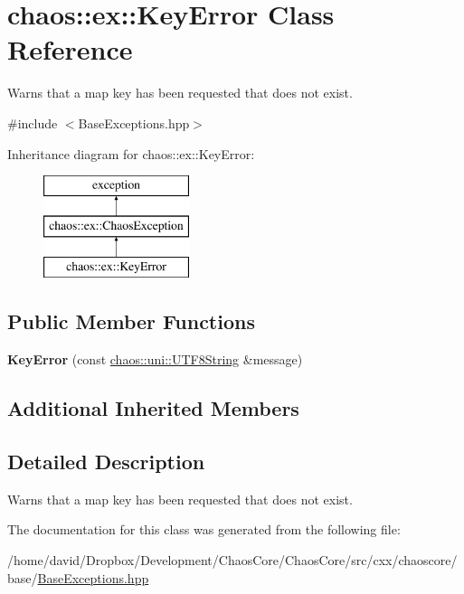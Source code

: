 \hypertarget{classchaos_1_1ex_1_1_key_error}{\section{chaos\-:\-:ex\-:\-:Key\-Error Class Reference}
\label{classchaos_1_1ex_1_1_key_error}
}


Warns that a map key has been requested that does not exist.  




{\ttfamily \#include $<$Base\-Exceptions.\-hpp$>$}

Inheritance diagram for chaos\-:\-:ex\-:\-:Key\-Error\-:\begin{figure}[H]
\begin{center}
\leavevmode
\includegraphics[height=3.000000cm]{classchaos_1_1ex_1_1_key_error}
\end{center}
\end{figure}
\subsection*{Public Member Functions}
\begin{DoxyCompactItemize}
\item 
\hypertarget{classchaos_1_1ex_1_1_key_error_ab784663047d04831ecb9150672a09b18}{{\bfseries Key\-Error} (const \hyperlink{classchaos_1_1uni_1_1_u_t_f8_string}{chaos\-::uni\-::\-U\-T\-F8\-String} \&message)}\label{classchaos_1_1ex_1_1_key_error_ab784663047d04831ecb9150672a09b18}

\end{DoxyCompactItemize}
\subsection*{Additional Inherited Members}


\subsection{Detailed Description}
Warns that a map key has been requested that does not exist. 

The documentation for this class was generated from the following file\-:\begin{DoxyCompactItemize}
\item 
/home/david/\-Dropbox/\-Development/\-Chaos\-Core/\-Chaos\-Core/src/cxx/chaoscore/base/\hyperlink{_base_exceptions_8hpp}{Base\-Exceptions.\-hpp}\end{DoxyCompactItemize}
